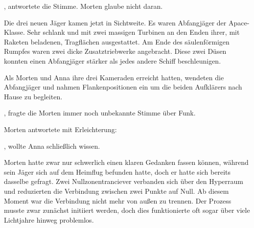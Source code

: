 \par

, antwortete die Stimme.  Morten glaube nicht daran.

\par

Die drei neuen Jäger kamen jetzt in Sichtweite. Es waren Abfangjäger der Apace-Klasse. Sehr schlank und mit zwei massigen Turbinen an den Enden ihrer, mit Raketen beladenen, Tragflächen ausgestattet. Am Ende des säulenförmigen Rumpfes waren zwei dicke Zusatztriebwerke angebracht. Diese zwei Düsen konnten einen Abfangjäger stärker als jedes andere Schiff beschleunigen.

\par

Als Morten und Anna ihre drei Kameraden erreicht hatten, wendeten die Abfangjäger und nahmen Flankenpositionen ein um die beiden Aufklärers nach Hause zu begleiten.

\par

, fragte die Morten immer noch unbekannte Stimme über Funk. 

\par

Morten antwortete mit Erleichterung: 

\par


\par

, wollte Anna schließlich wissen. 

\par

Morten hatte zwar nur schwerlich einen klaren Gedanken fassen können, während sein Jäger sich auf dem Heimflug befunden hatte, doch er hatte sich bereits dasselbe gefragt. Zwei Nullzonentranciever verbanden sich über den Hyperraum und reduzierten die Verbindung zwischen zwei Punkte auf Null. Ab diesem Moment war die Verbindung nicht mehr von außen zu trennen. Der Prozess musste zwar zunächst initiiert werden, doch dies funktionierte oft sogar über viele Lichtjahre hinweg problemlos.

